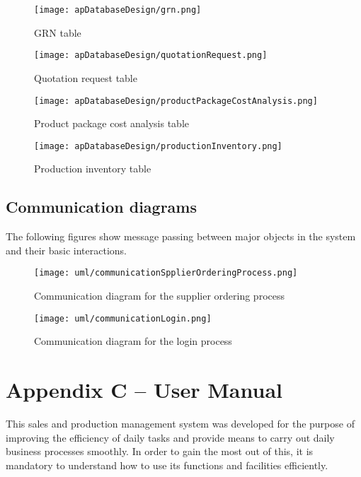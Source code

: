 \documentclass[12pt]{report}
\begin{document}
\begin{figure}[H]
	\centering
	\texttt{[image: apDatabaseDesign/grn.png]}
	\caption{GRN table}
\end{figure}

\begin{figure}[H]
	\centering
	\texttt{[image: apDatabaseDesign/quotationRequest.png]}
	\caption{Quotation request table}
\end{figure}

\begin{figure}[H]
	\centering
	\texttt{[image: apDatabaseDesign/productPackageCostAnalysis.png]}
	\caption{Product package cost analysis table}
\end{figure}

\begin{figure}[H]
	\centering
	\texttt{[image: apDatabaseDesign/productionInventory.png]}
	\caption{Production inventory table}
\end{figure}

\newpage
\section{Communication diagrams}
The following figures show message passing between major objects in the system and their basic interactions.

\begin{figure}[H]
	\centering
	\texttt{[image: uml/communicationSpplierOrderingProcess.png]}
	\caption{Communication diagram for the supplier ordering process}
\end{figure}

\begin{figure}[H]
	\centering
	\texttt{[image: uml/communicationLogin.png]}
	\caption{Communication diagram for the login process}
\end{figure}

\setcounter{chapter}{3}
\setcounter{section}{0}
\setcounter{figure}{0}
\chapter*{\Huge Appendix C – User Manual}
This sales and production management system was developed for the purpose of improving the efficiency of daily tasks and provide means to carry out daily business processes smoothly. In order to gain the most out of this, it is mandatory to understand how to use its functions and facilities efficiently.
\end{document}
